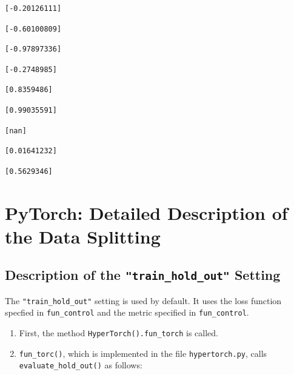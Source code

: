 \documentclass[
  letterpaper,
  DIV=11,
  numbers=noendperiod]{scrreprt}
\providecommand{\tightlist}{%
  \setlength{\itemsep}{0pt}\setlength{\parskip}{0pt}}\usepackage{longtable,booktabs,array}
\begin{document}
\begin{verbatim}
[-0.20126111]
\end{verbatim}

\begin{verbatim}
[-0.60100809]
\end{verbatim}

\begin{verbatim}
[-0.97897336]
\end{verbatim}

\begin{verbatim}
[-0.2748985]
\end{verbatim}

\begin{verbatim}
[0.8359486]
\end{verbatim}

\begin{verbatim}
[0.99035591]
\end{verbatim}

\begin{verbatim}
[nan]
\end{verbatim}

\begin{verbatim}
[0.01641232]
\end{verbatim}

\begin{verbatim}
[0.5629346]
\end{verbatim}

\newpage{}

\hypertarget{sec-detailed-data-splitting}{%
\section{PyTorch: Detailed Description of the Data
Splitting}\label{sec-detailed-data-splitting}}

\hypertarget{description-of-the-train_hold_out-setting}{%
\subsection{\texorpdfstring{Description of the
\texttt{"train\_hold\_out"}
Setting}{Description of the "train\_hold\_out" Setting}}\label{description-of-the-train_hold_out-setting}}

The \texttt{"train\_hold\_out"} setting is used by default. It uses the
loss function specfied in \texttt{fun\_control} and the metric specified
in \texttt{fun\_control}.

\begin{enumerate}
\def\labelenumi{\arabic{enumi}.}
\tightlist
\item
  First, the method \texttt{HyperTorch().fun\_torch} is called.
\item
  \texttt{fun\_torc()}, which is implemented in the file
  \texttt{hypertorch.py}, calls \texttt{evaluate\_hold\_out()} as
  follows:
\end{enumerate}
\end{document}
